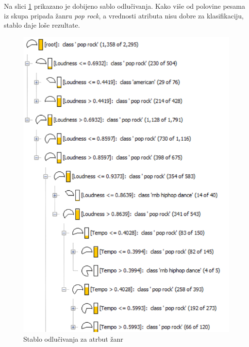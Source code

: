 Na slici \ref{fig:tree} prikazano je dobijeno sablo odlu\v{c}ivanja. Kako vi\v{s}e od polovine pesama iz skupa pripada \v{z}anru \emph{pop rock}, a vrednosti atributa nisu dobre za klasifikaciju, stablo daje lo\v{s}e rezultate.

\begin{figure}[H]
    \centering
    \includegraphics[scale=0.7]{resources/tree.png}
    \caption{Stablo odlu\v{c}ivanja za atrbut \v{z}anr}
    \label{fig:tree}
\end{figure}

